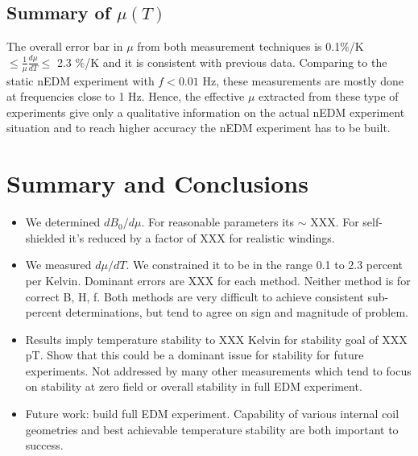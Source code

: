 \documentclass[review]{elsarticle}
\begin{document}

\subsection{Summary of $\mu(T)$}

 The overall error bar in $\mu$ from both measurement techniques is 0.1\%/K $\leq \frac{1}{\mu}\frac{d\mu}{dT} \leq$ 2.3 \%/K and it is consistent with previous data.
Comparing to the static nEDM experiment with $f < 0.01$ Hz, these measurements are mostly done at frequencies close to 1 Hz. Hence, the effective $\mu$ extracted from these type of experiments give
only a qualitative information on the actual nEDM experiment situation and to reach higher accuracy the nEDM experiment has to be built. 
\section{Summary and Conclusions}

\begin{itemize}
\item We determined $dB_0/d\mu$.  For reasonable parameters its $\sim$ XXX.  For self-shielded it's reduced by a factor of XXX for realistic windings.
\item We measured $d\mu/dT$.  We constrained it to be in the range 0.1
  to 2.3 percent per Kelvin.  Dominant errors are XXX for each method.
  Neither method is for correct B, H, f.  Both methods are very
  difficult to achieve consistent sub-percent determinations, but tend
  to agree on sign and magnitude of problem.
\item Results imply temperature stability to XXX Kelvin for stability
  goal of XXX pT.  Show that this could be a dominant issue for
  stability for future experiments.  Not addressed by many other
  measurements which tend to focus on stability at zero field or
  overall stability in full EDM experiment.
\item Future work: build full EDM experiment.  Capability of various
  internal coil geometries and best achievable temperature stability
  are both important to success.
\end{itemize}
\end{document}
